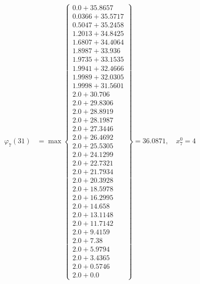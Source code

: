 \documentclass{article}
\begin{document}
\begin{align*}
\varphi_{7}(31) &= \max \left\{ \begin{array}{c}
0.0 + 35.8657 \\
 0.0366 + 35.5717 \\
 0.5047 + 35.2458 \\
 1.2013 + 34.8425 \\
 1.6807 + 34.4064 \\
 1.8987 + 33.936 \\
 1.9735 + 33.1535 \\
 1.9941 + 32.4666 \\
 1.9989 + 32.0305 \\
 1.9998 + 31.5601 \\
 2.0 + 30.706 \\
 2.0 + 29.8306 \\
 2.0 + 28.8919 \\
 2.0 + 28.1987 \\
 2.0 + 27.3446 \\
 2.0 + 26.4692 \\
 2.0 + 25.5305 \\
 2.0 + 24.1299 \\
 2.0 + 22.7321 \\
 2.0 + 21.7934 \\
 2.0 + 20.3928 \\
 2.0 + 18.5978 \\
 2.0 + 16.2995 \\
 2.0 + 14.658 \\
 2.0 + 13.1148 \\
 2.0 + 11.7142 \\
 2.0 + 9.4159 \\
 2.0 + 7.38 \\
 2.0 + 5.9794 \\
 2.0 + 3.4365 \\
 2.0 + 0.5746 \\
 2.0 + 0.0
\end{array} \right\}=36.0871, \quad x_{7}^0=4\\
  

\end{align*}
\end{document}
